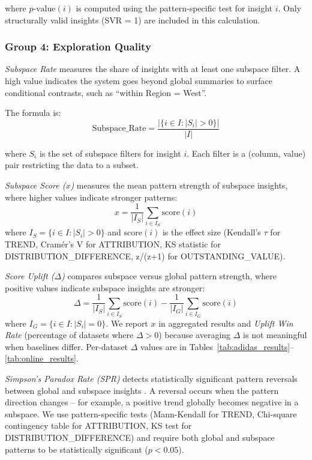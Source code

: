 \documentclass[conference]{IEEEtran}
\begin{document}
where $p\text{-value}(i)$ is computed using the pattern-specific test for insight $i$. Only structurally valid insights (SVR = 1) are included in this calculation.

\subsubsection{Group 4: Exploration Quality}

\textit{Subspace Rate} measures the share of insights with at least one subspace filter. A high value indicates the system goes beyond global summaries to surface conditional contrasts, such as ``within Region = West''.

The formula is:
\begin{equation}
\text{Subspace\_Rate} = \frac{|\{i \in I : |S_i| > 0\}|}{|I|}
\end{equation}

where $S_i$ is the set of subspace filters for insight $i$. Each filter is a (column, value) pair restricting the data to a subset.

\textit{Subspace Score ($x$)} measures the mean pattern strength of subspace insights, where higher values indicate stronger patterns:
\begin{equation}
x = \frac{1}{|I_S|}\sum_{i \in I_S} \text{score}(i)
\end{equation}
where $I_S = \{i \in I : |S_i| > 0\}$ and $\text{score}(i)$ is the effect size (Kendall's $\tau$ for TREND, Cramér's V for ATTRIBUTION, KS statistic for DISTRIBUTION\_DIFFERENCE, z/(z+1) for OUTSTANDING\_VALUE).

\textit{Score Uplift ($\Delta$)} compares subspace versus global pattern strength, where positive values indicate subspace insights are stronger:
\begin{equation}
\Delta = \frac{1}{|I_S|}\sum_{i \in I_S} \text{score}(i) - \frac{1}{|I_G|}\sum_{i \in I_G} \text{score}(i)
\end{equation}
where $I_G = \{i \in I : |S_i| = 0\}$. We report $x$ in aggregated results and \textit{Uplift Win Rate} (percentage of datasets where $\Delta > 0$) because averaging $\Delta$ is not meaningful when baselines differ. Per-dataset $\Delta$ values are in Tables~\ref{tab:adidas_results}--\ref{tab:online_results}.

\textit{Simpson's Paradox Rate (SPR)} detects statistically significant pattern reversals between global and subspace insights \cite{simpson}. A reversal occurs when the pattern direction changes -- for example, a positive trend globally becomes negative in a subspace. We use pattern-specific tests (Mann-Kendall for TREND, Chi-square contingency table for ATTRIBUTION, KS test for DISTRIBUTION\_DIFFERENCE) and require both global and subspace patterns to be statistically significant ($p < 0.05$).
\end{document}
